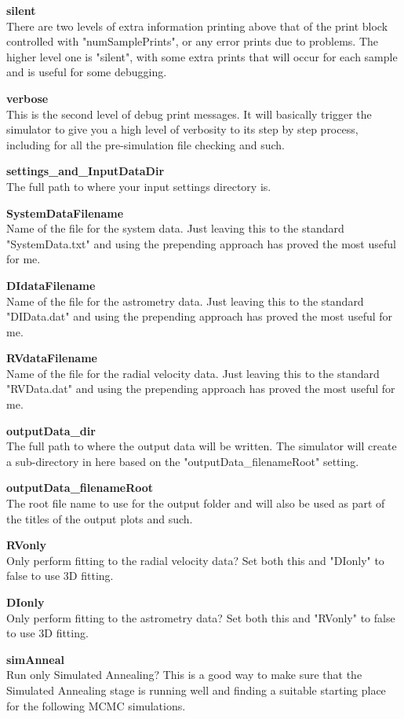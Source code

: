\documentclass[12pt,preprint]{aastex}
\begin{document}
{\bf silent}\\
There are two levels of extra information printing above that of the print block controlled with "numSamplePrints", or any error prints due to problems.  The higher level one is "silent", with some extra prints that will occur for each sample and is useful for some debugging.


{\bf verbose}\\
This is the second level of debug print messages.  It will basically trigger the simulator to give you a high level of verbosity to its step by step process, including for all the pre-simulation file checking and such.

{\bf settings\_and\_InputDataDir}\\
The full path to where your input settings directory is.  

{\bf SystemDataFilename}\\
Name of the file for the system data.  Just leaving this to the standard "SystemData.txt" and using the prepending approach has proved the most useful for me.

{\bf DIdataFilename}\\
Name of the file for the astrometry data.  Just leaving this to the standard "DIData.dat" and using the prepending approach has proved the most useful for me.

{\bf RVdataFilename}\\
Name of the file for the radial velocity data.  Just leaving this to the standard "RVData.dat" and using the prepending approach has proved the most useful for me.

{\bf outputData\_dir}\\
The full path to where the output data will be written.  The simulator will create a sub-directory in here based on the "outputData\_filenameRoot" setting.

{\bf outputData\_filenameRoot}\\
The root file name to use for the output folder and will also be used as part of the titles of the output plots and such.

{\bf RVonly}\\
Only perform fitting to the radial velocity data?  Set both this and "DIonly" to false to use 3D fitting.

{\bf DIonly}\\
Only perform fitting to the astrometry data?  Set both this and "RVonly" to false to use 3D fitting.

{\bf simAnneal}\\
Run only Simulated Annealing?  This is a good way to make sure that the Simulated Annealing stage is running well and finding a suitable starting place for the following MCMC simulations.
\end{document}
